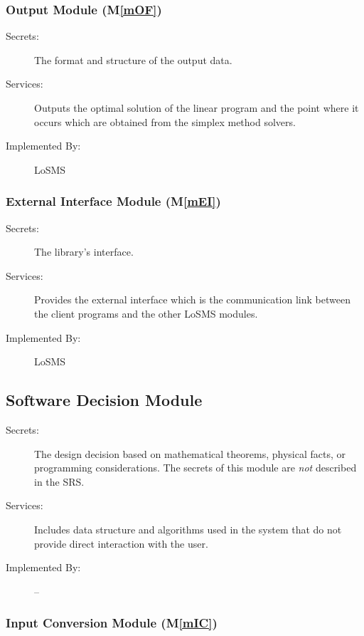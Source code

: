 \documentclass[12pt, titlepage]{article}
\newcommand{\mref}[1]{M\ref{#1}}
\newcommand{\famname}{LoSMS} %
\begin{document}
\subsubsection{Output Module (\mref{mOF})}

\begin{description}
	\item[Secrets:]The format and structure of the output data.
	\item[Services:]Outputs the optimal solution of the linear program and the 
	point where it occurs which are obtained from the simplex method solvers.
	\item[Implemented By:] \famname{}
\end{description}

\subsubsection{External Interface Module (\mref{mEI})}

\begin{description}
	\item[Secrets:]The library's interface.
	\item[Services:]Provides the external interface which is the communication 
	link between the client programs and the other \famname{} modules.
	\item[Implemented By:] \famname{}
\end{description}

\subsection{Software Decision Module}

\begin{description}
\item[Secrets:] The design decision based on mathematical theorems, physical
  facts, or programming considerations. The secrets of this module are
  \emph{not} described in the SRS.
\item[Services:] Includes data structure and algorithms used in the system that
  do not provide direct interaction with the user. 
\item[Implemented By:] --
\end{description}

\subsubsection{Input Conversion Module (\mref{mIC})}
\end{document}
